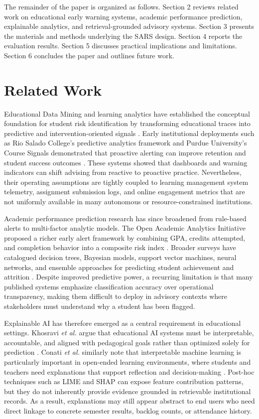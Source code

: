 \documentclass{article}
\begin{document}
The remainder of the paper is organized as follows. Section 2 reviews related work on educational early warning systems, academic performance prediction, explainable analytics, and retrieval-grounded advisory systems. Section 3 presents the materials and methods underlying the SARS design. Section 4 reports the evaluation results. Section 5 discusses practical implications and limitations. Section 6 concludes the paper and outlines future work.

\section{Related Work}
Educational Data Mining and learning analytics have established the conceptual foundation for student risk identification by transforming educational traces into predictive and intervention-oriented signals \cite{baker2014edm}. Early institutional deployments such as Rio Salado College's predictive analytics framework and Purdue University's Course Signals demonstrated that proactive alerting can improve retention and student success outcomes \cite{essa2012predictive,arnold2012course}. These systems showed that dashboards and warning indicators can shift advising from reactive to proactive practice. Nevertheless, their operating assumptions are tightly coupled to learning management system telemetry, assignment submission logs, and online engagement metrics that are not uniformly available in many autonomous or resource-constrained institutions.

Academic performance prediction research has since broadened from rule-based alerts to multi-factor analytic models. The Open Academic Analytics Initiative proposed a richer early alert framework by combining GPA, credits attempted, and completion behavior into a composite risk index \cite{jayaprakash2014early}. Broader surveys have catalogued decision trees, Bayesian models, support vector machines, neural networks, and ensemble approaches for predicting student achievement and attrition \cite{romero2020survey,hussain2019predicting,summers2021predicting}. Despite improved predictive power, a recurring limitation is that many published systems emphasize classification accuracy over operational transparency, making them difficult to deploy in advisory contexts where stakeholders must understand why a student has been flagged.

Explainable AI has therefore emerged as a central requirement in educational settings. Khosravi \emph{et al.} argue that educational AI systems must be interpretable, accountable, and aligned with pedagogical goals rather than optimized solely for prediction \cite{khosravi2022xai}. Conati \emph{et al.} similarly note that interpretable machine learning is particularly important in open-ended learning environments, where students and teachers need explanations that support reflection and decision-making \cite{conati2018interpretable}. Post-hoc techniques such as LIME and SHAP can expose feature contribution patterns, but they do not inherently provide evidence grounded in retrievable institutional records. As a result, explanations may still appear abstract to end users who need direct linkage to concrete semester results, backlog counts, or attendance history.
\end{document}
